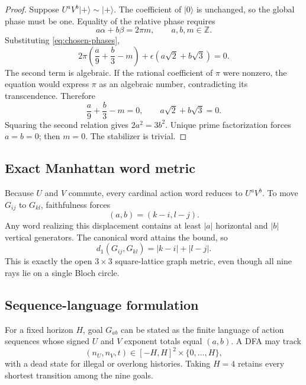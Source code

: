 \documentclass[11pt]{article}
\theoremstyle{definition}
\theoremstyle{remark}
\newcommand{\Z}{\mathbb Z}
\newcommand{\ket}[1]{\lvert #1\rangle}
\begin{document}
\begin{proof}
Suppose $U^aV^b\ket+\sim\ket+$. The coefficient of $\ket0$ is unchanged, so
the global phase must be one. Equality of the relative phase requires
\begin{equation}
 a\alpha+b\beta=2\pi m,\qquad a,b,m\in\Z.
 \label{eq:phase-equation}
\end{equation}
Substituting \cref{eq:chosen-phases},
\begin{equation}
 2\pi\left(\frac a9+\frac b3-m\right)
 +\epsilon(a\sqrt2+b\sqrt3)=0.
 \label{eq:transcendence-equation}
\end{equation}
The second term is algebraic. If the rational coefficient of $\pi$ were
nonzero, the equation would express $\pi$ as an algebraic number, contradicting
its transcendence. Therefore
\begin{equation}
 \frac a9+\frac b3-m=0,\qquad a\sqrt2+b\sqrt3=0.
\end{equation}
Squaring the second relation gives $2a^2=3b^2$. Unique prime factorization
forces $a=b=0$; then $m=0$. The stabilizer is trivial.
\end{proof}

\subsection{Exact Manhattan word metric}

Because $U$ and $V$ commute, every cardinal action word reduces to
$U^aV^b$. To move $G_{ij}$ to $G_{kl}$, faithfulness forces
\begin{equation}
 (a,b)=(k-i,l-j).
\end{equation}
Any word realizing this displacement contains at least $|a|$ horizontal and
$|b|$ vertical generators. The canonical word attains the bound, so
\begin{equation}
 \boxed{
 d_1(G_{ij},G_{kl})=|k-i|+|l-j|
 }.
 \label{eq:exact-manhattan}
\end{equation}
This is exactly the open $3\times3$ square-lattice graph metric, even though
all nine rays lie on a single Bloch circle.

\subsection{Sequence-language formulation}

For a fixed horizon $H$, goal $G_{ab}$ can be stated as the finite language
of action sequences whose signed $U$ and $V$ exponent totals equal $(a,b)$.
A DFA may track
\begin{equation}
 (n_U,n_V,t)\in[-H,H]^2\times\{0,\ldots,H\},
\end{equation}
with a dead state for illegal or overlong histories. Taking $H=4$ retains
every shortest transition among the nine goals.
\end{document}
